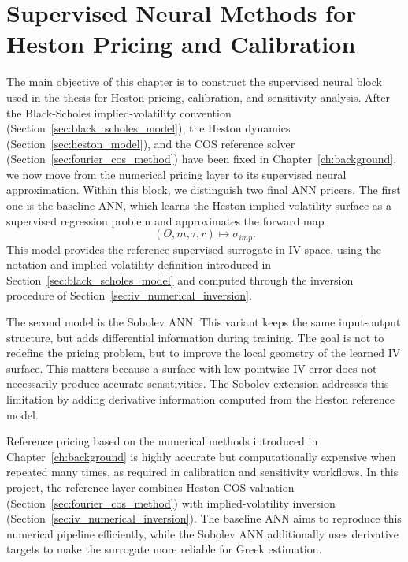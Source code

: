 \chapter{Supervised Neural Methods for Heston Pricing and Calibration}
\label{ch:ann_surrogate}
\label{ch:cann}

The main objective of this chapter is to construct the supervised neural block used in the thesis for Heston pricing, calibration, and sensitivity analysis. After the Black-Scholes implied-volatility convention (Section~\ref{sec:black_scholes_model}), the Heston dynamics (Section~\ref{sec:heston_model}), and the COS reference solver (Section~\ref{sec:fourier_cos_method}) have been fixed in Chapter~\ref{ch:background}, we now move from the numerical pricing layer to its supervised neural approximation. Within this block, we distinguish two final ANN pricers. The first one is the baseline ANN, which learns the Heston implied-volatility surface as a supervised regression problem and approximates the forward map
\[
(\Theta,m,\tau,r)\mapsto \sigma_{imp}.
\]
This model provides the reference supervised surrogate in IV space, using the notation and implied-volatility definition introduced in Section~\ref{sec:black_scholes_model} and computed through the inversion procedure of Section~\ref{sec:iv_numerical_inversion}.

The second model is the Sobolev ANN. This variant keeps the same input-output structure, but adds differential information during training. The goal is not to redefine the pricing problem, but to improve the local geometry of the learned IV surface. This matters because a surface with low pointwise IV error does not necessarily produce accurate sensitivities. The Sobolev extension addresses this limitation by adding derivative information computed from the Heston reference model.

Reference pricing based on the numerical methods introduced in Chapter~\ref{ch:background} is highly accurate but computationally expensive when repeated many times, as required in calibration and sensitivity workflows. In this project, the reference layer combines Heston-COS valuation (Section~\ref{sec:fourier_cos_method}) with implied-volatility inversion (Section~\ref{sec:iv_numerical_inversion}). The baseline ANN aims to reproduce this numerical pipeline efficiently, while the Sobolev ANN additionally uses derivative targets to make the surrogate more reliable for Greek estimation.

